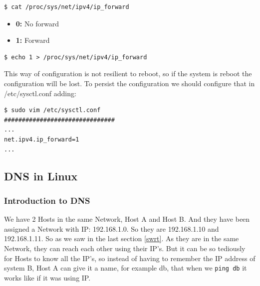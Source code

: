 \documentclass{article}
\newenvironment{blocktemplateIII}[1]{%
    \tcolorbox[beamer,%
    noparskip,breakable,
    ,colframe=Red,%
    colbacklower=LimeGreen!75!LightGreen,%
    title=#1]}%
    {\endtcolorbox}
\newenvironment{codetemplate}[1][]{%
  \mybasecolorbox[#1]
  \itshape
}{%
  \endmybasecolorbox
}
\begin{document}
\begin{codetemplate}{}
\begin{verbatim}
$ cat /proc/sys/net/ipv4/ip_forward
\end{verbatim}
\end{codetemplate}

\begin{itemize}
    \item \textbf{0:} No forward
    \item \textbf{1:} Forward
\end{itemize}


\begin{codetemplate}{}
\begin{verbatim}
$ echo 1 > /proc/sys/net/ipv4/ip_forward
\end{verbatim}
\end{codetemplate}

\begin{blocktemplateIII}{WARNING}
This way of configuration is not resilient to reboot, so if the system is reboot the configuration will be lost. To persist the configuration we should configure that in /etc/sysctl.conf adding:
\begin{codetemplate}{}
\begin{verbatim}
$ sudo vim /etc/sysctl.conf
###############################
...
net.ipv4.ip_forward=1
...
\end{verbatim}
\end{codetemplate}

\end{blocktemplateIII}

\subsection{DNS in Linux}

\subsubsection{Introduction to DNS}

We have 2 Hosts in the same Network, Host A and Host B. And they have been assigned a Network with IP: 192.168.1.0. So they are 192.168.1.10 and 192.168.1.11. So as we saw in the last section \ref{swrt}. As they are in the same Network, they can reach each other using their IP's. But it can be so tediously for Hosts to know all the IP's, so instead of having to remember the IP address of system B, Host A can give it a name, for example db, that when we \verb|ping db| it works like if it was using IP.
\end{document}
